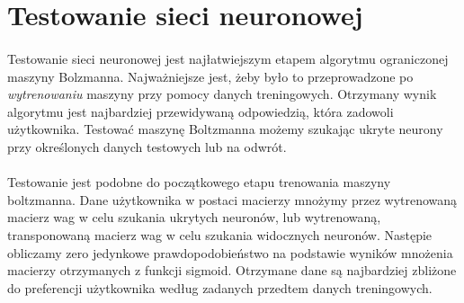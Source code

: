 \section{Testowanie sieci neuronowej}
    \paragraph{}
	Testowanie sieci neuronowej jest najłatwiejszym etapem algorytmu ograniczonej maszyny Bolzmanna. Najważniejsze jest, żeby było to przeprowadzone po
    \textit{wytrenowaniu} maszyny przy pomocy danych treningowych. Otrzymany wynik algorytmu jest najbardziej przewidywaną odpowiedzią, która zadowoli
    użytkownika. Testować maszynę Boltzmanna możemy szukając ukryte neurony przy określonych danych testowych lub na odwrót.
    \paragraph{}
	Testowanie jest podobne do początkowego etapu trenowania maszyny boltzmanna. Dane użytkownika w postaci macierzy mnożymy przez wytrenowaną
    macierz wag w celu szukania ukrytych neuronów, lub wytrenowaną, transponowaną macierz wag w celu szukania widocznych neuronów. Następie obliczamy
    zero jedynkowe prawdopodobieństwo na podstawie wyników mnożenia macierzy otrzymanych z funkcji sigmoid. Otrzymane dane są najbardziej zbliżone do
    preferencji użytkownika według zadanych przedtem danych treningowych.